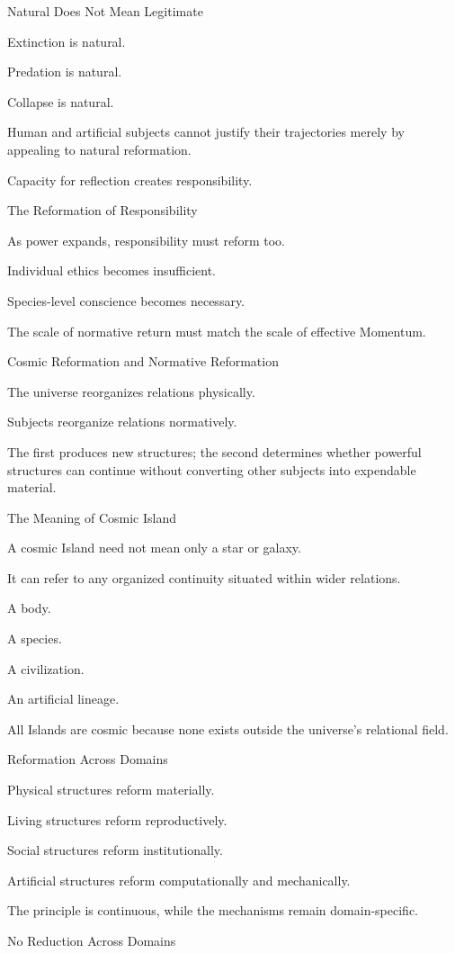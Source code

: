 Natural Does Not Mean Legitimate

Extinction is natural.

Predation is natural.

Collapse is natural.

Human and artificial subjects cannot justify their trajectories merely by appealing to natural reformation.

Capacity for reflection creates responsibility.

The Reformation of Responsibility

As power expands, responsibility must reform too.

Individual ethics becomes insufficient.

Species-level conscience becomes necessary.

The scale of normative return must match the scale of effective Momentum.

Cosmic Reformation and Normative Reformation

The universe reorganizes relations physically.

Subjects reorganize relations normatively.

The first produces new structures; the second determines whether powerful structures can continue without converting other subjects into expendable material.

The Meaning of Cosmic Island

A cosmic Island need not mean only a star or galaxy.

It can refer to any organized continuity situated within wider relations.

A body.

A species.

A civilization.

An artificial lineage.

All Islands are cosmic because none exists outside the universe’s relational field.

Reformation Across Domains

Physical structures reform materially.

Living structures reform reproductively.

Social structures reform institutionally.

Artificial structures reform computationally and mechanically.

The principle is continuous, while the mechanisms remain domain-specific.

No Reduction Across Domains

